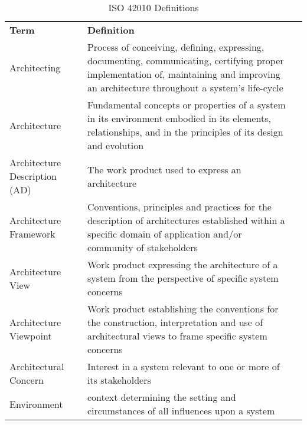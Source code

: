 \begin{table}[h]
\centering
\begin{tabularx}{\textwidth}{|p{2.5cm}|X|l}
\cline{1-2}
\cellcolor[HTML]{C0C0C0}\textbf{Term} & \cellcolor[HTML]{C0C0C0}\textbf{Definition}                                                                                                                                              &  \\ \cline{1-2}
Architecting                          & Process of conceiving, defining, expressing, documenting, communicating, certifying proper implementation of, maintaining and improving an architecture throughout a system's life-cycle &  \\ \cline{1-2}
Architecture                          & Fundamental concepts or properties of a system in its environment embodied in its elements, relationships, and in the principles of its design and evolution                             &  \\ \cline{1-2}
Architecture Description (AD)         & The work product used to express an architecture                                                                                                                                         &  \\ \cline{1-2}
Architecture Framework                & Conventions, principles and practices for the description of architectures established within a specific domain of application and/or community of stakeholders                          &  \\ \cline{1-2}
Architecture View                     & Work product expressing the architecture of a system from the perspective of specific system concerns                                                                                    &  \\ \cline{1-2}
Architecture Viewpoint                & Work product establishing the conventions for the construction, interpretation and use of architectural views to frame specific system concerns                                          &  \\ \cline{1-2}
Architectural Concern                 & Interest in a system relevant to one or more of its stakeholders                                                                                                                         &  \\ \cline{1-2}
Environment                           & context determining the setting and circumstances of all influences upon a system                                                                                                        &  \\ \cline{1-2}
\end{tabularx}
\caption{ISO 42010 Definitions}
\label{table:iso_def}
\end{table}
\newpage


